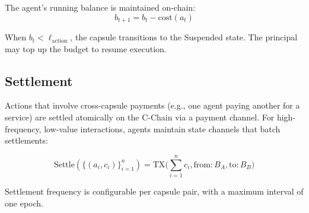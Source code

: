 The agent's running balance is maintained on-chain:
\begin{equation}\label{eq:balance}
    b_{t+1} = b_t - \text{cost}(a_t)
\end{equation}

When $b_t < \ell_{\text{action}}$, the capsule transitions to the Suspended state. The principal may top up the budget to resume execution.

\subsection{Settlement}

Actions that involve cross-capsule payments (e.g., one agent paying another for a service) are settled atomically on the C-Chain via a payment channel. For high-frequency, low-value interactions, agents maintain state channels that batch settlements:

\begin{equation}\label{eq:settlement}
    \text{Settle}(\{(a_i, c_i)\}_{i=1}^{n}) = \text{TX}\Big(\sum_{i=1}^{n} c_i, \text{from}: B_A, \text{to}: B_B\Big)
\end{equation}

Settlement frequency is configurable per capsule pair, with a maximum interval of one epoch.

